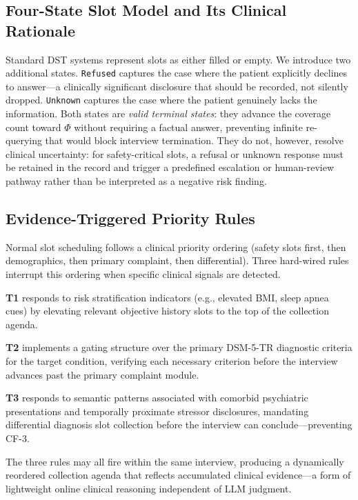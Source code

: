 \documentclass[conference]{IEEEtran}
\begin{document}
\subsection{Four-State Slot Model and Its Clinical Rationale}

Standard DST systems represent slots as either filled or empty. We introduce two additional states. \texttt{Refused} captures the case where the patient explicitly declines to answer---a clinically significant disclosure that should be recorded, not silently dropped. \texttt{Unknown} captures the case where the patient genuinely lacks the information. Both states are \textit{valid terminal states}: they advance the coverage count toward $\Phi$ without requiring a factual answer, preventing infinite re-querying that would block interview termination. They do not, however, resolve clinical uncertainty: for safety-critical slots, a refusal or unknown response must be retained in the record and trigger a predefined escalation or human-review pathway rather than be interpreted as a negative risk finding.

\subsection{Evidence-Triggered Priority Rules}

Normal slot scheduling follows a clinical priority ordering (safety slots first, then demographics, then primary complaint, then differential). Three hard-wired rules interrupt this ordering when specific clinical signals are detected.

\textbf{T1} responds to risk stratification indicators (e.g., elevated BMI, sleep apnea cues) by elevating relevant objective history slots to the top of the collection agenda.

\textbf{T2} implements a gating structure over the primary DSM-5-TR diagnostic criteria for the target condition, verifying each necessary criterion before the interview advances past the primary complaint module.

\textbf{T3} responds to semantic patterns associated with comorbid psychiatric presentations and temporally proximate stressor disclosures, mandating differential diagnosis slot collection before the interview can conclude---preventing CF-3.

The three rules may all fire within the same interview, producing a dynamically reordered collection agenda that reflects accumulated clinical evidence---a form of lightweight online clinical reasoning independent of LLM judgment.
\end{document}
